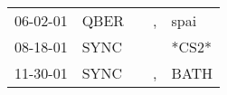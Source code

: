 \begin{supertabular}{p{0.07\textwidth}p{0.06\textwidth}p{0.02\textwidth}p{0.02\textwidth}p{0.06\textwidth}}
 06-02-01\textsuperscript{} &  QBER\textsuperscript{} &   &  , &  spai\textsuperscript{} \\
 08-18-01\textsuperscript{} &  SYNC\textsuperscript{} &   &    &                   *CS2* \\
 11-30-01\textsuperscript{} &  SYNC\textsuperscript{} &   &  , &  BATH\textsuperscript{} \\
\end{supertabular}
